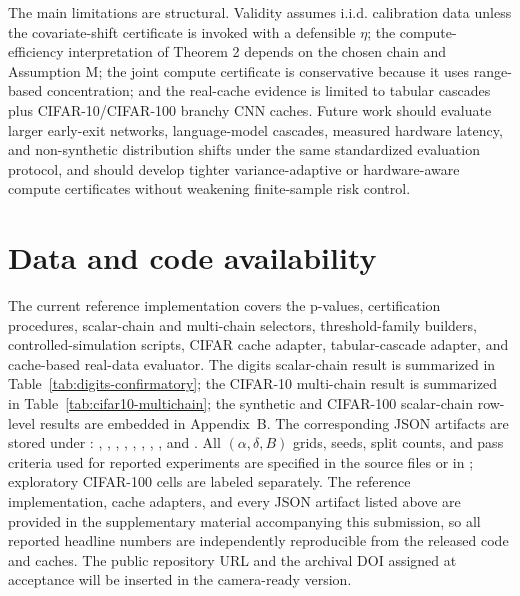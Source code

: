 \documentclass{ieeeaccess}
\begin{document}
The main limitations are structural. Validity assumes i.i.d. calibration data unless the covariate-shift certificate is invoked with a defensible $\eta$; the compute-efficiency interpretation of Theorem 2 depends on the chosen chain and Assumption M; the joint compute certificate is conservative because it uses range-based concentration; and the real-cache evidence is limited to tabular cascades plus CIFAR-10/CIFAR-100 branchy CNN caches. Future work should evaluate larger early-exit networks, language-model cascades, measured hardware latency, and non-synthetic distribution shifts under the same standardized evaluation protocol, and should develop tighter variance-adaptive or hardware-aware compute certificates without weakening finite-sample risk control.

\section{Data and code availability}

\begin{sloppypar}
The current reference implementation covers the p-values, certification procedures, scalar-chain and multi-chain selectors, threshold-family builders, controlled-simulation scripts, CIFAR cache adapter, tabular-cascade adapter, and cache-based real-data evaluator. The digits scalar-chain result is summarized in Table~\ref{tab:digits-confirmatory}; the CIFAR-10 multi-chain result is summarized in Table~\ref{tab:cifar10-multichain}; the synthetic and CIFAR-100 scalar-chain row-level results are embedded in Appendix~B. The corresponding JSON artifacts are stored under : , , , , , , , , and . All $(\alpha,\delta,B)$ grids, seeds, split counts, and pass criteria used for reported experiments are specified in the source files or in ; exploratory CIFAR-100 cells are labeled separately. The reference implementation, cache adapters, and every JSON artifact listed above are provided in the supplementary material accompanying this submission, so all reported headline numbers are independently reproducible from the released code and caches. The public repository URL and the archival DOI assigned at acceptance will be inserted in the camera-ready version.
\end{sloppypar}
\end{document}
